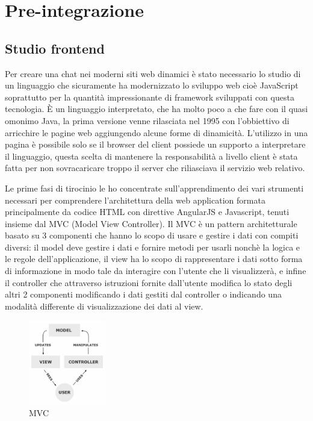 \chapter{Pre-integrazione}


\section{Studio frontend}
Per creare una chat nei moderni siti web dinamici è stato necessario lo studio di un linguaggio che sicuramente ha modernizzato lo sviluppo web cioè JavaScript soprattutto per la quantità impressionante di framework sviluppati con questa tecnologia.
È un linguaggio interpretato, che ha molto poco a che fare con il quasi omonimo Java, la prima versione venne rilasciata nel 1995 con l'obbiettivo di arricchire le pagine web aggiungendo alcune forme di dinamicità. L'utilizzo in una pagina è possibile solo se il browser del client possiede un supporto a interpretare il linguaggio, questa scelta di mantenere la responsabilità a livello client è stata fatta per non sovracaricare troppo il server che riliasciava il servizio web relativo.

Le prime fasi di tirocinio le ho concentrate sull'apprendimento dei vari strumenti necessari per comprendere l'architettura della web application formata principalmente da codice HTML con direttive AngularJS e Javascript, tenuti insieme dal MVC (Model View Controller).
Il MVC è un pattern architetturale basato su 3 componenti che hanno lo scopo di usare e gestire i dati con compiti diversi: il model deve gestire i dati e fornire metodi per usarli nonchè la logica e le regole dell'applicazione, il view ha lo scopo di rappresentare i dati sotto forma di informazione in modo tale da interagire con l'utente che li visualizzerà, e infine il controller che attraverso istruzioni fornite dall'utente modifica lo stato degli altri 2 componenti modificando i dati gestiti dal controller o indicando una modalità differente di visualizzazione dei dati al view.
\begin{figure}[H]
 \centering
  \includegraphics[width=0.3\textwidth]{img/MVC-Process.png}
 \caption{MVC}
 \end{figure}

